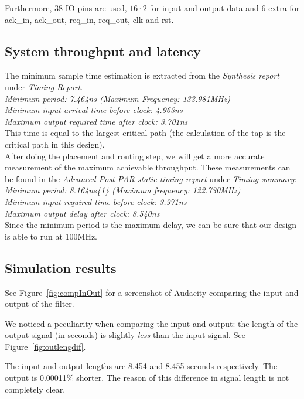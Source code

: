 \documentclass[a4paper,twoside,11pt, fleqn]{article}
\begin{document}
Furthermore, 38 IO pins are used, $16\cdot 2$ for input and output data and 6 extra for ack\_in, ack\_out, req\_in, req\_out, clk and rst.

\newpage
\subsection{System throughput and latency}
\label{sec:thr4}
The minimum sample time estimation is extracted from the \textit{Synthesis report} under \textit{Timing Report}.\\

   \textit{Minimum period:  7.464ns (Maximum Frequency: 133.981MHz)\\
   Minimum input arrival time before clock: 4.963ns\\
   Maximum output required time after clock: 3.701ns}\\

This time is equal to the largest critical path (the calculation of the tap is the critical path in this design).\\

After doing the placement and routing step, we will get a more accurate measurement of the maximum achievable throughput. These measurements can be found in the \textit{Advanced Post-PAR static timing report} under \textit{Timing summary}:\\

\textit{Minimum period:   8.164ns\{1\}   (Maximum frequency: 122.730MHz)\\
   Minimum input required time before clock:   3.971ns\\
   Maximum output delay after clock:   8.540ns}\\

Since the minimum period is the maximum delay, we can be sure that our design is able to run at 100MHz.

\newpage
\subsection{Simulation results}
See Figure~\ref{fig:compInOut} for a screenshot of Audacity comparing the input and output of the filter.

We noticed a peculiarity when comparing the input and output: the length of the output signal (in seconds) is slightly \textit{less} than the input signal. See Figure~\ref{fig:outlengdif}.

The input and output lengths are 8.454 and 8.455 seconds respectively. The output is 0.00011\% shorter. The reason of this difference in signal length is not completely clear.
\end{document}
